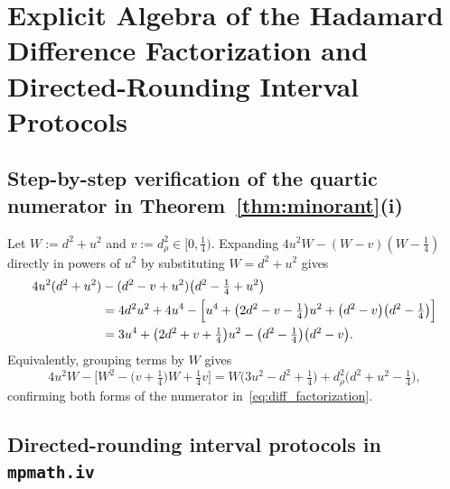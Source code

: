 \documentclass[11pt,reqno]{amsart}
\theoremstyle{definition}
\theoremstyle{remark}
\numberwithin{equation}{section}
\begin{document}
\section{Explicit Algebra of the Hadamard Difference Factorization and Directed-Rounding Interval Protocols}\label{app:hadamard_iv}

\subsection{Step-by-step verification of the quartic numerator in Theorem~\ref{thm:minorant}(i)}

Let $W := d^2 + u^2$ and $v := d_\rho^2 \in [0, \frac{1}{4})$. Expanding $4u^2 W - (W - v)(W - \frac{1}{4})$ directly in powers of $u^2$ by substituting $W = d^2 + u^2$ gives
\begin{align*}
4u^2(d^2 + u^2) &- (d^2 - v + u^2)\bigl(d^2 - \tfrac{1}{4} + u^2\bigr) \\
&= 4d^2 u^2 + 4u^4 - \Bigl[u^4 + \bigl(2d^2 - v - \tfrac{1}{4}\bigr)u^2 + \bigl(d^2 - v\bigr)\bigl(d^2 - \tfrac{1}{4}\bigr)\Bigr] \\
&= 3u^4 + \bigl(2d^2 + v + \tfrac{1}{4}\bigr)u^2 - \bigl(d^2 - \tfrac{1}{4}\bigr)\bigl(d^2 - v\bigr).
\end{align*}
Equivalently, grouping terms by $W$ gives
\[
4u^2 W - \bigl[W^2 - \bigl(v + \tfrac{1}{4}\bigr)W + \tfrac{1}{4}v\bigr] = W\bigl(3u^2 - d^2 + \tfrac{1}{4}\bigr) + d_\rho^2\bigl(d^2 + u^2 - \tfrac{1}{4}\bigr),
\]
confirming both forms of the numerator in~\eqref{eq:diff_factorization}.

\subsection{Directed-rounding interval protocols in \texttt{mpmath.iv}}
\end{document}
